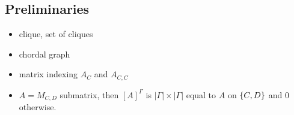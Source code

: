 \subsection{Preliminaries}

\begin{itemize}
    \item clique, set of cliques
    \item chordal graph
    \item matrix indexing $A_C$ and $A_{C, C}$
    \item $A = M_{C, D}$ submatrix, then $[A]^\Gamma$ is $|\Gamma| \times |\Gamma|$ equal to $A$ on ${\left\{C, D\right\}}$ and 0 otherwise.
\end{itemize}
